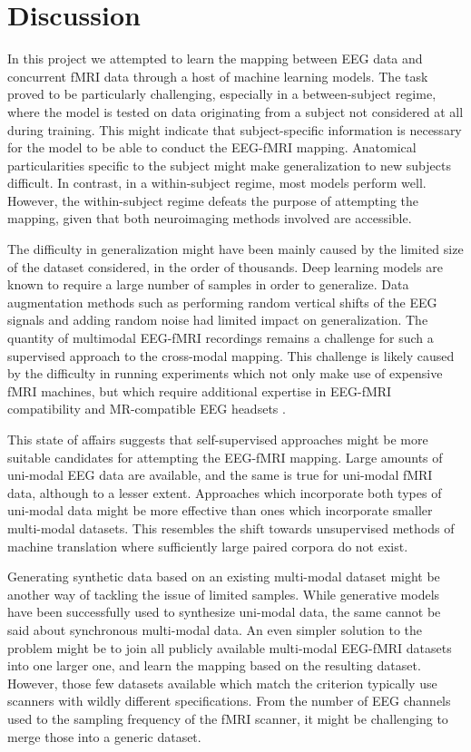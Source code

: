 \documentclass{article}
\begin{document}
\section{Discussion}

In this project we attempted to learn the mapping between EEG data and concurrent fMRI data through a host of machine learning models. The task proved to be particularly challenging, especially in a between-subject regime, where the model is tested on data originating from a subject not considered at all during training. This might indicate that subject-specific information is necessary for the model to be able to conduct the EEG-fMRI mapping. Anatomical particularities specific to the subject might make generalization to new subjects difficult. In contrast, in a within-subject regime, most models perform well. However, the within-subject regime defeats the purpose of attempting the mapping, given that both neuroimaging methods involved are accessible.

The difficulty in generalization might have been mainly caused by the limited size of the dataset considered, in the order of thousands. Deep learning models are known to require a large number of samples in order to generalize. Data augmentation methods such as performing random vertical shifts of the EEG signals and adding random noise had limited impact on generalization. The quantity of multimodal EEG-fMRI recordings remains a challenge for such a supervised approach to the cross-modal mapping. This challenge is likely caused by the difficulty in running experiments which not only make use of expensive fMRI machines, but which require additional expertise in EEG-fMRI compatibility and MR-compatible EEG headsets \cite{calhas_eeg_2020}.

This state of affairs suggests that self-supervised approaches might be more suitable candidates for attempting the EEG-fMRI mapping. Large amounts of uni-modal EEG data are available, and the same is true for uni-modal fMRI data, although to a lesser extent. Approaches which incorporate both types of uni-modal data might be more effective than ones which incorporate smaller multi-modal datasets. This resembles the shift towards unsupervised methods of machine translation where sufficiently large paired corpora do not exist.

Generating synthetic data based on an existing multi-modal dataset might be another way of tackling the issue of limited samples. While generative models have been successfully used to synthesize uni-modal data, the same cannot be said about synchronous multi-modal data. An even simpler solution to the problem might be to join all publicly available multi-modal EEG-fMRI datasets into one larger one, and learn the mapping based on the resulting dataset. However, those few datasets available which match the criterion typically use scanners with wildly different specifications. From the number of EEG channels used to the sampling frequency of the fMRI scanner, it might be challenging to merge those into a generic dataset.
\end{document}

